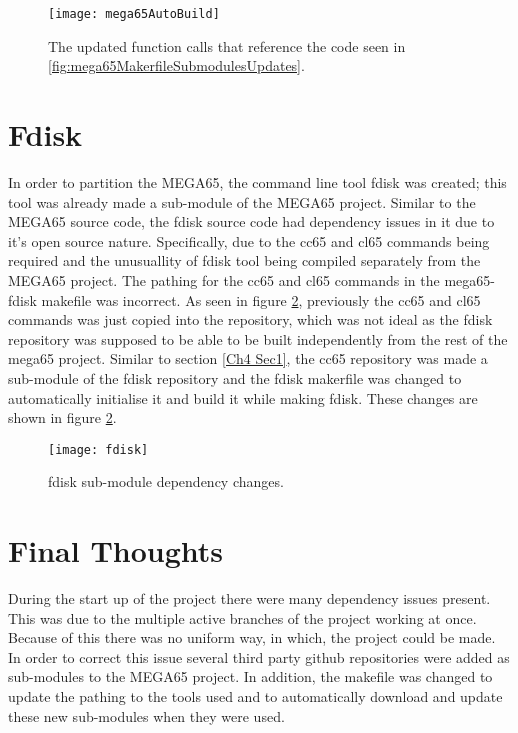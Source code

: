 \begin{figure}
  \centering
  \texttt{[image: mega65AutoBuild]}
  \caption{The updated function calls that reference the code seen in \ref{fig:mega65MakerfileSubmodulesUpdates}.}
  \label{fig:mega65AutoBuild}
\end{figure}


\section{Fdisk}

\label{Ch4 Sec2}

In order to partition the MEGA65, the command line tool fdisk was created; this tool was already made a sub-module of the MEGA65 project. Similar to the MEGA65 source code, the fdisk source code had dependency issues in it due to it's open source nature. Specifically, due to the cc65 and cl65 commands being required and the unusuallity of fdisk tool being compiled separately from the MEGA65 project. The pathing for the cc65 and cl65 commands in the mega65-fdisk makefile was incorrect. As seen in figure \ref{fig:fdisk}, previously the cc65 and cl65 commands was just copied into the repository, which was not ideal as the fdisk repository was supposed to be able to be built independently from the rest of the mega65 project. Similar to section \ref{Ch4 Sec1}, the cc65 repository was made a sub-module of the fdisk repository and the fdisk makerfile was changed to automatically initialise it and build it while making fdisk. These changes are shown in figure \ref{fig:fdisk}.\\

\begin{figure}
  \centering
  \texttt{[image: fdisk]}
  \caption{fdisk sub-module dependency changes.}
  \label{fig:fdisk}
\end{figure}

\section{Final Thoughts}

During the start up of the project there were many dependency issues present. This was due to the multiple active branches of the project working at once. Because of this there was no uniform way, in which, the project could be made. In order to correct this issue several third party github repositories were added as sub-modules to the MEGA65 project. In addition, the makefile was changed to update the pathing to the tools used and to automatically download and update these new sub-modules when they were used.
